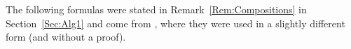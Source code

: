 \documentclass[\MainFolder/Text.tex]{subfiles}
\begin{document}
The following formulas were stated in Remark~\ref{Rem:Compositions} in Section~\ref{Sec:Alg1} and come from \cite{Cieliebak2015}, where they were used in a slightly different form (and without a proof).
%
%
%
%
%
%
%
\end{document}
